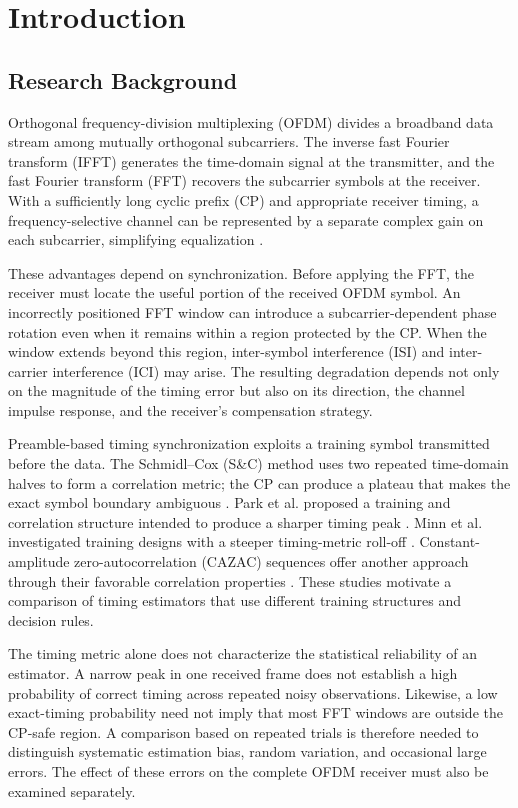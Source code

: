 \chapter{Introduction}
\label{chap:introduction}

\section{Research Background}
Orthogonal frequency-division multiplexing (OFDM) divides a broadband data stream among mutually orthogonal subcarriers. The inverse fast Fourier transform (IFFT) generates the time-domain signal at the transmitter, and the fast Fourier transform (FFT) recovers the subcarrier symbols at the receiver. With a sufficiently long cyclic prefix (CP) and appropriate receiver timing, a frequency-selective channel can be represented by a separate complex gain on each subcarrier, simplifying equalization \cite{vannee2000,morelli2007}.

These advantages depend on synchronization. Before applying the FFT, the receiver must locate the useful portion of the received OFDM symbol. An incorrectly positioned FFT window can introduce a subcarrier-dependent phase rotation even when it remains within a region protected by the CP. When the window extends beyond this region, inter-symbol interference (ISI) and inter-carrier interference (ICI) may arise. The resulting degradation depends not only on the magnitude of the timing error but also on its direction, the channel impulse response, and the receiver's compensation strategy.

Preamble-based timing synchronization exploits a training symbol transmitted before the data. The Schmidl--Cox (S\&C) method uses two repeated time-domain halves to form a correlation metric; the CP can produce a plateau that makes the exact symbol boundary ambiguous \cite{schmidl1997}. Park et al. proposed a training and correlation structure intended to produce a sharper timing peak \cite{park2003}. Minn et al. investigated training designs with a steeper timing-metric roll-off \cite{minn2003}. Constant-amplitude zero-autocorrelation (CAZAC) sequences offer another approach through their favorable correlation properties \cite{fang2012}. These studies motivate a comparison of timing estimators that use different training structures and decision rules.

The timing metric alone does not characterize the statistical reliability of an estimator. A narrow peak in one received frame does not establish a high probability of correct timing across repeated noisy observations. Likewise, a low exact-timing probability need not imply that most FFT windows are outside the CP-safe region. A comparison based on repeated trials is therefore needed to distinguish systematic estimation bias, random variation, and occasional large errors. The effect of these errors on the complete OFDM receiver must also be examined separately.


